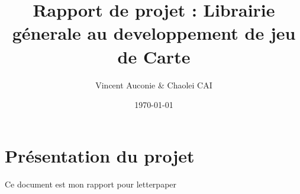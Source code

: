 \documentclass[12pt, letterpaper]{article}
\title{Rapport de projet : Librairie génerale au developpement de jeu de Carte}
\author{Vincent Auconie \& Chaolei CAI
\\ 
  \multicolumn{1}{
      p{.7\textwidth}}{\centering\emph{Université de Paris \\
  UFR info\\}
  M1 Informatique}
}
\date{\today}
\begin{document}
\begin{titlepage}
    \maketitle
\end{titlepage}

\tableofcontents

\section{Présentation du projet}
Ce document est mon rapport pour letterpaper


\end{document}
